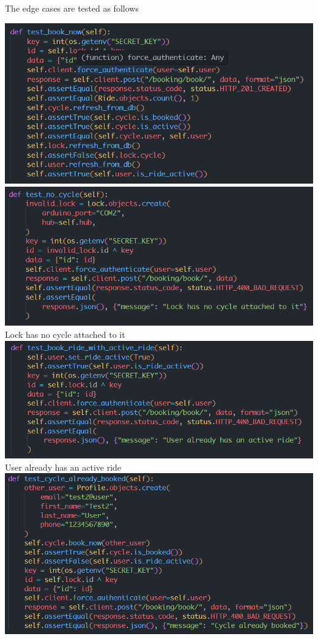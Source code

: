 \documentclass[11pt]{article}
\begin{document}
The edge cases are tested as follows
\begin{center}
    \includegraphics[scale=0.5]{unit_testing_codes/start_ride_1.png}\\
    \includegraphics[scale=0.7]{unit_testing_codes/start_ride_2.png}\\
    Lock has no cycle attached to it\\
    \includegraphics[scale=0.7]{unit_testing_codes/start_ride_3.png}\\
    User already has an active ride\\
    \includegraphics[scale=0.7]{unit_testing_codes/start_ride_4.png}\\

\end{center}
\end{document}
